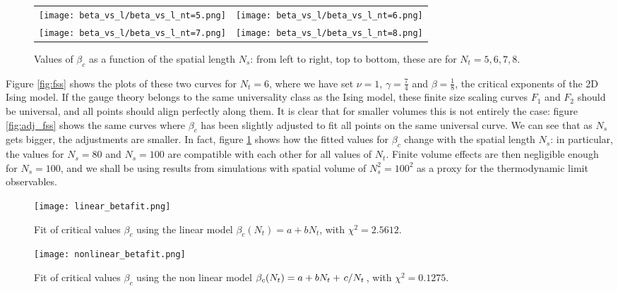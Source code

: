 \documentclass[reqno,12pt]{article}
\numberwithin{equation}{section}
\begin{document}
\begin{figure}[h]
	\centering
	\begin{tabular}{c c}
		\texttt{[image: beta\_vs\_l/beta\_vs\_l\_nt=5.png]} &
		\texttt{[image: beta\_vs\_l/beta\_vs\_l\_nt=6.png]}
		\\
		\texttt{[image: beta\_vs\_l/beta\_vs\_l\_nt=7.png]} &
		\texttt{[image: beta\_vs\_l/beta\_vs\_l\_nt=8.png]}
	\end{tabular}
	\caption[$\beta_c$ as a function of $N_s$]{Values of $\beta_c$ as a function of the spatial length $N_s$: from
	left to right, top to bottom, these are for $N_t = 5, 6, 7, 8$.}
\label{fig:beta_vs_ns}
\end{figure}


Figure \ref{fig:fss} shows the plots of these two curves for $N_t = 6$, where we have set $\nu = 1$, $\gamma = \frac{7}{4}$
and $\beta = \frac{1}{8}$, the critical exponents of the 2D Ising model. If the gauge theory belongs to the same universality
class as the Ising model, these finite size scaling curves $F_1$ and $F_2$ should be universal, and all points should align
perfectly along them. It is clear that for smaller volumes this is not entirely the case: figure \ref{fig:adj_fss} shows
the same curves where $\beta_c$ has been slightly adjusted to fit all points on the same universal curve.
We can see that as $N_s$ gets
bigger, the adjustments are smaller. In fact, figure \ref{fig:beta_vs_ns} shows how
the fitted values for $\beta_c$ change with the spatial length $N_s$: in particular, the values for $N_s = 80$ and
$N_s = 100$ are compatible with each other for all values of $N_t$. 
Finite volume effects are then negligible enough for $N_s = 100$, and we
shall be using results from simulations with spatial volume of $N_s^2 = 100^2$ as a proxy for the thermodynamic limit
observables. 

\begin{figure}[h]
	\centering
	\texttt{[image: linear\_betafit.png]}
	\caption[Linear fit for $\beta_c(N_t)$]{Fit of critical values $\beta_c$ using the linear model 
	$\beta_c(N_t) = a + bN_t$, with $\chi^2 = 2.5612$.}
\label{fig:linear_betafit}
\end{figure}

\begin{figure}[h]
	\centering
	\texttt{[image: nonlinear\_betafit.png]}
	\caption[Non linear fit for $\beta_c(N_t)$]{Fit of critical values $\beta_c$ using the non linear model 
	$\beta_c(N_t) = a + bN_t + \flatfrac{c}{N_t}$, with $\chi^2 = 0.1275$.}
\label{fig:nonlinear_betafit}
\end{figure}
\end{document}
